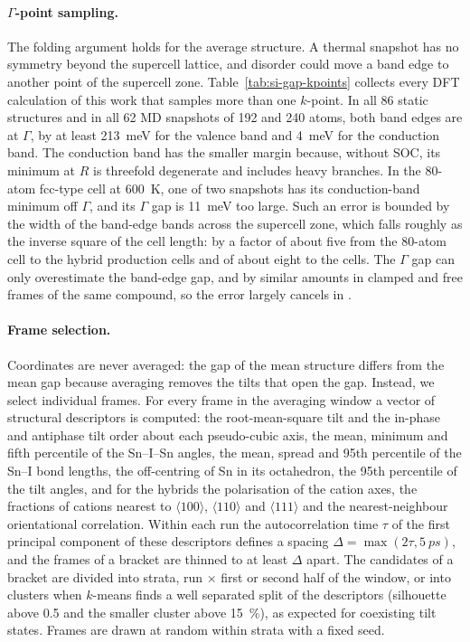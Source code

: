 \paragraph{$\Gamma$-point sampling.}
The folding argument holds for the average structure. A thermal snapshot has
no symmetry beyond the supercell lattice, and disorder could move a band edge
to another point of the supercell zone. Table~\ref{tab:si-gap-kpoints}
collects every DFT calculation of this work that samples more than one
$k$-point. In all 86 static structures and in all 62 MD snapshots of 192 and
240 atoms, both band edges are at $\Gamma$, by at least \SI{213}{meV} for the
valence band and \SI{4}{meV} for the conduction band. The conduction band has
the smaller margin because, without SOC, its minimum at $R$ is threefold
degenerate and includes heavy branches. In the 80-atom fcc-type cell at
\SI{600}{K}, one of two snapshots has its conduction-band minimum off
$\Gamma$, and its $\Gamma$ gap is \SI{11}{meV} too large. Such an error is
bounded by the width of the band-edge bands across the supercell zone, which
falls roughly as the inverse square of the cell length: by a factor of about
five from the 80-atom cell to the hybrid production cells and of about eight
to the \CsSnI{} cells. The $\Gamma$ gap can only overestimate the band-edge
gap, and by similar amounts in clamped and free frames of the same compound,
so the error largely cancels in \dEg{}.

\paragraph{Frame selection.}
Coordinates are never averaged: the gap of the mean structure differs from
the mean gap because averaging removes the tilts that open the gap. Instead, we
select individual frames. For every frame in the averaging window a vector of
structural descriptors is computed: the root-mean-square tilt and the in-phase
and antiphase tilt order about each pseudo-cubic axis, the mean, minimum and
fifth percentile of the Sn--I--Sn angles, the mean, spread and 95th percentile
of the Sn--I bond lengths, the off-centring of Sn in its octahedron, the 95th
percentile of the tilt angles, and for the hybrids the polarisation of the
cation axes, the fractions of cations nearest to $\langle100\rangle$,
$\langle110\rangle$ and $\langle111\rangle$ and the nearest-neighbour
orientational correlation. Within each run the autocorrelation time $\tau$ of
the first principal component of these descriptors defines a spacing
$\Delta = \max(2\tau, \SI{5}{ps})$, and the frames of a bracket are thinned to
at least $\Delta$ apart. The candidates of a bracket are divided into strata,
run $\times$ first or second half of the window, or into clusters when
$k$-means finds a well separated split of the descriptors (silhouette above 0.5
and the smaller cluster above \SI{15}{\percent}), as expected for coexisting
tilt states. Frames are drawn at random within strata with a fixed seed.

